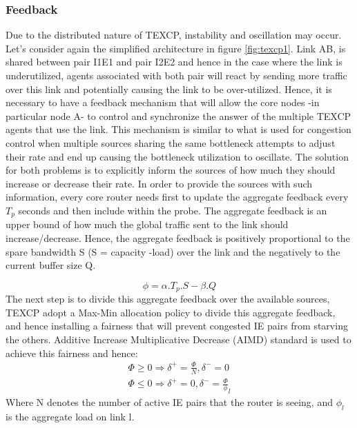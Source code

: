 \subsubsection{Feedback}
Due to the distributed nature of TEXCP, instability and oscillation may occur. Let's consider again the simplified architecture in figure \ref{fig:texcp1}. Link AB, is shared between pair I1E1 and pair I2E2 and hence in the case where the link is underutilized, agents associated with both pair will react by sending more traffic over this link and potentially causing the link to be over-utilized. Hence, it is necessary to have a feedback mechanism that will allow the core nodes -in particular node A-  to control and synchronize the answer of the multiple TEXCP agents that use the link. This mechanism is similar to what is used for congestion control when multiple sources sharing the same bottleneck attempts to adjust their rate and end up causing the bottleneck utilization to oscillate. The solution for both problems is to explicitly inform the sources of how much they should increase or decrease their rate. In order to provide the sources with such information, every core router needs first to update the aggregate feedback every $T_{p}$ seconds and then include within the probe. The aggregate feedback is an upper bound of how much the global traffic sent to the link should increase/decrease. Hence, the aggregate feedback is positively proportional to the spare bandwidth S (S = capacity -load) over the link and the negatively to the current buffer size Q.

\begin {equation}
\phi = \alpha . T_{p} . S - \beta . Q
\end {equation}
The next step is to divide this aggregate feedback over the available sources, TEXCP adopt a Max-Min allocation policy to divide this aggregate feedback, and hence installing a fairness that will prevent congested IE pairs from starving the others. Additive Increase Multiplicative Decrease (AIMD) standard is used to achieve this fairness and hence: 
\begin {eqnarray}
\Phi \ge 0 \Rightarrow \delta^+ = \frac{\Phi} {N}, \delta^- = 0 \\
\Phi \le 0 \Rightarrow \delta^+ = 0 , \delta^- = \frac{\Phi} \phi_l
\end {eqnarray}
Where N denotes the number of active IE pairs that the router is seeing, and $\phi_l$ is the aggregate load on link l.


